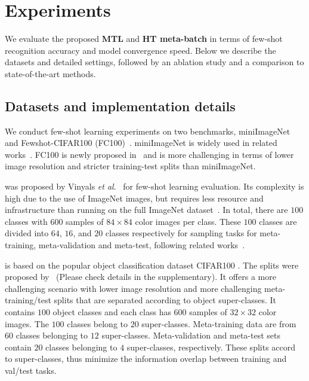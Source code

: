 \section{Experiments}
\label{sec_exp}

We evaluate the proposed \textbf{MTL} and \textbf{HT meta-batch} in terms of few-shot recognition accuracy and model convergence speed.
%
Below we describe the datasets and detailed settings, followed by an ablation study and a comparison to state-of-the-art methods.

\subsection{Datasets and implementation details}
\label{sec_dataset}

We conduct few-shot learning experiments on two benchmarks, miniImageNet~\cite{VinyalsBLKW16} and Fewshot-CIFAR100 (FC100)~\cite{OreshkinNIPS18}. 
%
miniImageNet is widely used in related works~\cite{FinnAL17, RaviICLR2017, GrantICLR2018, FranceschiICML18, MunkhdalaiICML18}. FC100 is newly proposed in~\cite{OreshkinNIPS18} and is more challenging in terms of lower image resolution and stricter training-test splits than miniImageNet.

 was proposed by Vinyals \emph{et al}.~\cite{VinyalsBLKW16} for few-shot learning evaluation. 
%
Its complexity is high due to the use of ImageNet images, but requires less resource and infrastructure than running on the full ImageNet dataset~\cite{Russakovsky2015}. 
%
In total, there are $100$ classes with $600$ samples of $84 \times 84$ color images per class.
%
These $100$ classes are divided into $64$, $16$, and $20$ classes respectively for sampling tasks for meta-training, meta-validation and meta-test, following related works~\cite{FinnAL17, RaviICLR2017, GrantICLR2018, FranceschiICML18, MunkhdalaiICML18}.


is based on the popular object classification dataset CIFAR100 \cite{CIFAR100}. The splits were proposed by~\cite{OreshkinNIPS18} (Please check details in the supplementary).
%
It offers a more challenging scenario with lower image resolution and more challenging meta-training/test splits that are separated according to object super-classes.
%
It contains $100$ object classes and each class has $600$ samples of $32 \times 32$ color images.
%
%
The $100$ classes belong to $20$ super-classes. Meta-training data are from $60$ classes belonging to $12$ super-classes. Meta-validation and meta-test sets contain $20$ classes belonging to $4$ super-classes, respectively. 
These splits accord to super-classes, thus minimize the information overlap between training and val/test tasks. 

